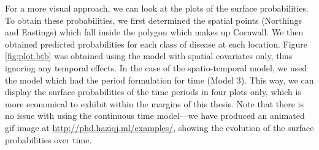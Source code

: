 \documentclass[a4paper,showframe,11pt]{report}\usepackage[]{graphicx}\usepackage[]{color}
\begin{document}
For a more visual approach, we can look at the plots of the surface probabilities.
To obtain these probabilities, we first determined the spatial points (Northings and Eastings) which fall inside the polygon which makes up Cornwall.
We then obtained predicted probabilities for each class of disease at each location.
Figure \ref{fig:plot.btb} was obtained using the model with spatial covariates only, thus ignoring any temporal effects.
In the case of the spatio-temporal model, we used the model which had the period formulation for time (Model 3).
This way, we can display the surface probabilities of the time periods in four plots only, which is more economical to exhibit within the margins of this thesis.
Note that there is no issue with using the continuous time model---we have produced an animated gif image at \url{http://phd.haziqj.ml/examples/}, showing the evolution of the surface probabilities over time.
\end{document}
